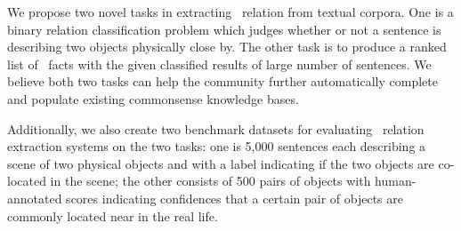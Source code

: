 We propose two novel tasks in extracting \lnear\ relation from textual corpora.
One is a binary relation classification problem which judges whether or not
a sentence is describing two objects physically close by.
The other task is to produce a ranked list of \lnear\
facts with the given classified results of 
large number of sentences. 
We believe both two tasks can help the community further automatically complete and populate existing commonsense knowledge bases.

Additionally, we also create two benchmark datasets for evaluating \lnear~relation extraction systems on the two tasks: one is 5,000 sentences 
each describing a scene of two physical objects and with a label indicating if the two objects are co-located in the scene; 
the other consists of 500 pairs of objects with human-annotated scores indicating confidences that a certain pair of objects are commonly located near in the real life. 

%

